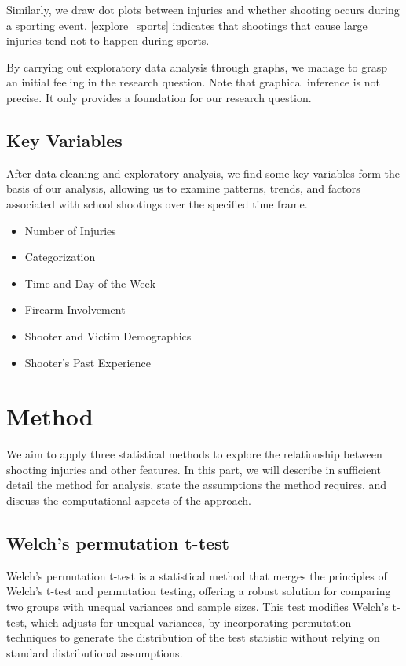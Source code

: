 \documentclass[12pt]{article}
\numberwithin{figure}{section}
\begin{document}
Similarly, we draw dot plots between injuries and whether shooting occurs during a sporting event. \ref{explore_sports} indicates that shootings that cause large injuries tend not to happen during sports.

By carrying out exploratory data analysis through graphs, we manage to grasp an initial feeling in the research question. Note that graphical inference is not precise. It only provides a foundation for our research question.

\subsection{Key Variables}

After data cleaning and exploratory analysis, we find some key variables form the basis of our analysis, allowing us to examine patterns, trends, and factors associated with school shootings over the specified time frame. 

\begin{itemize}
    \item Number of Injuries
    \item Categorization
    \item Time and Day of the Week
    \item Firearm Involvement
    \item Shooter and Victim Demographics
    \item Shooter's Past Experience
\end{itemize}


\section{Method}

We aim to apply three statistical methods to explore the relationship between shooting injuries and other features. In this part, we will describe in sufficient detail the method for analysis, state the assumptions the method requires, and discuss the computational aspects of the approach.

\subsection{Welch's permutation t-test}

Welch's permutation t-test is a statistical method that merges the principles of Welch's t-test and permutation testing, offering a robust solution for comparing two groups with unequal variances and sample sizes. This test modifies Welch's t-test, which adjusts for unequal variances, by incorporating permutation techniques to generate the distribution of the test statistic without relying on standard distributional assumptions. 
\end{document}
